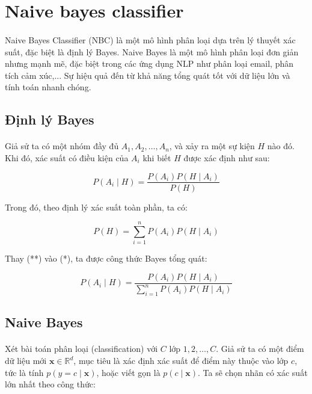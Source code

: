 \newpage
\section{Naive bayes classifier}

\paragraph{}{Naive Bayes Classifier (NBC) là một mô hình phân loại dựa trên lý thuyết xác suất, đặc biệt là định lý Bayes. Naive Bayes là một mô hình phân loại đơn giản nhưng mạnh mẽ, đặc biệt trong các ứng dụng NLP như phân loại email, phân tích cảm xúc,... Sự hiệu quả đến từ khả năng tổng quát tốt với dữ liệu lớn và tính toán nhanh chóng.}

\subsection{Định lý Bayes}

\paragraph{}{Giả sử ta có một nhóm đầy đủ \( A_1, A_2, \dots, A_n \), và xảy ra một sự kiện \( H \) nào đó. Khi đó, xác suất có điều kiện của \( A_i \) khi biết \( H \) được xác định như sau:}

\[
P(A_i \mid H) = \frac{P(A_i)P(H \mid A_i)}{P(H)}
\tag{*}
\]

Trong đó, theo định lý xác suất toàn phần, ta có:

\[
P(H) = \sum_{i=1}^{n} P(A_i)P(H \mid A_i)
\tag{**}
\]

Thay (**) vào (*), ta được công thức Bayes tổng quát:

\[
P(A_i \mid H) = \frac{P(A_i)P(H \mid A_i)}{\sum\limits_{i=1}^{n} P(A_i)P(H \mid A_i)}
\tag{***}
\]

\subsection{Naive Bayes}
\paragraph{}{Xét bài toán phân loại (classification) với $C$ lớp $1, 2, \ldots, C$. Giả sử ta có một điểm dữ liệu mới $\mathbf{x} \in \mathbb{R}^d$, mục tiêu là xác định xác suất để điểm này thuộc vào lớp $c$, tức là tính $p(y = c \mid \mathbf{x})$, hoặc viết gọn là $p(c \mid \mathbf{x})$.
Ta sẽ chọn nhãn có xác suất lớn nhất theo công thức:}

